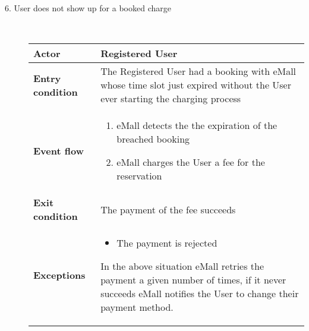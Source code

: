 \documentclass[11pt]{article}
\begin{document}
\begin{description}
    \item [6. User does not show up for a booked charge] \hfill \\
    \begin{table}[H]
        \centering
        \setlength{\tabcolsep}{18pt}
        \renewcommand{\arraystretch}{1.4}
        \begin{tabularx}{\textwidth}{|>{\hsize=0.5\hsize}X|>{\hsize=1.5\hsize}X|}
            \hline
            \textbf{Actor} & Registered User \\
            \hline
            \textbf{Entry condition} & The Registered User had a booking with eMall whose time slot just expired without the User ever starting the charging process \\
            \hline
            \textbf{Event flow} & 
                \begin{minipage}[t]{\hsize}
                \begin{enumerate}[topsep=0pt, leftmargin=*]
                    \item eMall detects the the expiration of the breached booking
                    \item eMall charges the User a fee for the reservation
                \end{enumerate}
                \end{minipage}
                \vspace{6pt}
            \\
            \hline
            \textbf{Exit condition} & The payment of the fee succeeds \\
            \hline
            \textbf{Exceptions} & 
                \begin{minipage}[t]{\hsize}
                \vspace{0pt}
                \begin{itemize}[topsep=0pt, leftmargin=*]
                    \item The payment is rejected
                \end{itemize}
                \vspace{8pt}
                \end{minipage}
                In the above situation eMall retries the payment a given number of times, if it never succeeds eMall notifies the User to change their payment method.
                \vspace{6pt}
            \\
            \hline
        \end{tabularx}
    \end{table}
    

\end{description}
\end{document}
